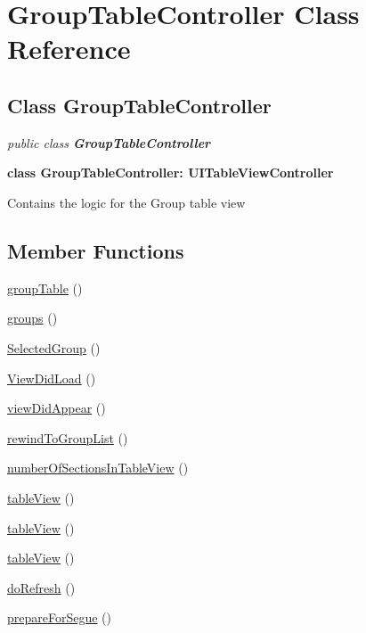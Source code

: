 
\hypertarget{class_GroupTableController.iOS}{\section{GroupTableController Class Reference}
\label{class_GroupTableController.iOS}
}

\subsection*{Class GroupTableController}

\textit{public class \textbf{GroupTableController}}

\tab \textbf{class GroupTableController: UITableViewController}

Contains the logic for the Group table view\\

\subsection*{Member Functions}
\begin{DoxyCompactItemize}
\item 
\hyperlink{class_GroupTableController.iOS.groupTable}{groupTable} ()
\item 
\hyperlink{class_GroupTableController.iOS.groups}{groups} ()
\item 
\hyperlink{class_GroupTableController.iOS.SelectedGroup}{SelectedGroup} ()
\item 
\hyperlink{class_GroupTableController.iOS.viewDidLoad}{ViewDidLoad} ()
\item 
\hyperlink{class_GroupTableController.iOS.viewDidAppear}{viewDidAppear} ()
\item 
\hyperlink{class_GroupTableController.iOS.rewindToGroupList}{rewindToGroupList} ()
\item 
\hyperlink{class_GroupTableController.iOS.numberOfSectionsInTableView}{numberOfSectionsInTableView} ()
\item 
\hyperlink{class_GroupTableController.iOS.tableView}{tableView} ()
\item 
\hyperlink{class_GroupTableController.iOS.tableView2}{tableView} ()
\item 
\hyperlink{class_GroupTableController.iOS.tableView3}{tableView} ()
\item 
\hyperlink{class_GroupTableController.iOS.doRefresh}{doRefresh} ()
\item 
\hyperlink{class_GroupTableController.iOS.prepareForSegue}{prepareForSegue} ()
\end{DoxyCompactItemize}




